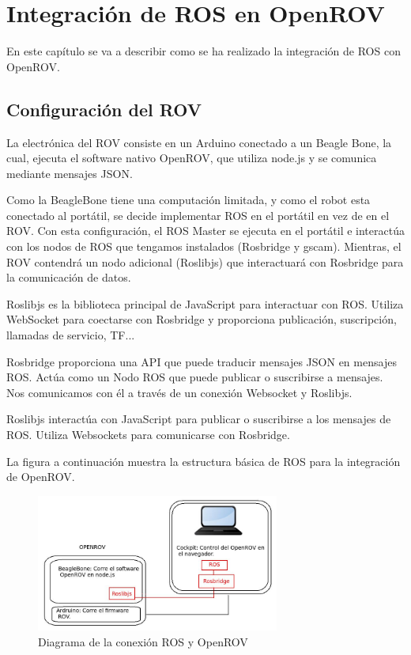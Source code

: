 \chapter{Integración de ROS en OpenROV}
\label{cap:integracionROS}

En este capítulo se va a describir como se ha realizado la integración de ROS con OpenROV.

\section{Configuración del ROV}
\label{cap:Configuracion del ROV}
La electrónica del ROV consiste en un Arduino conectado a un Beagle Bone, la cual, ejecuta el software nativo OpenROV, que utiliza node.js y se comunica mediante mensajes JSON.

Como la BeagleBone tiene una computación limitada, y como el robot esta conectado al portátil, se decide implementar ROS en el portátil en vez de en el ROV. Con esta configuración, el ROS Master se ejecuta en el portátil e interactúa con los nodos de ROS que tengamos instalados (Rosbridge y gscam).
Mientras, el ROV contendrá un nodo adicional (Roslibjs) que interactuará con Rosbridge para la comunicación de datos.

Roslibjs es la biblioteca principal de JavaScript para interactuar con ROS. Utiliza WebSocket para coectarse con Rosbridge y proporciona publicación, suscripción, llamadas de servicio, TF...

Rosbridge proporciona una API que puede traducir mensajes JSON en mensajes ROS. Actúa como un Nodo ROS que puede publicar o suscribirse a mensajes. Nos comunicamos con él a través de un conexión Websocket y Roslibjs.

Roslibjs interactúa con JavaScript para publicar o suscribirse a los mensajes de ROS. Utiliza Websockets para comunicarse con Rosbridge.

La figura a continuación muestra la estructura básica de ROS para la integración de OpenROV.

\begin{figure} [hbtp]
  \begin{center}
    \includegraphics[width=8cm]{img/cap4/conect_ros_rov}
  \end{center}
  \caption{Diagrama de la conexión ROS y OpenROV}
  \label{fig:conect_ros_rov}
\end{figure}

